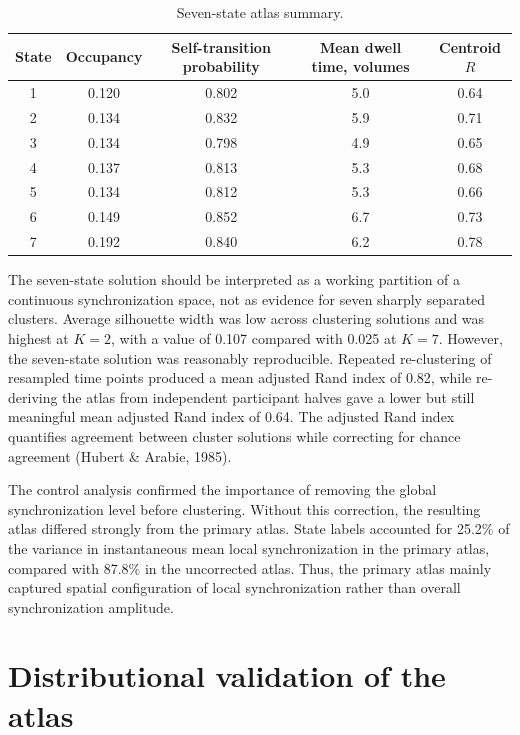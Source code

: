 \documentclass[12pt,a4paper]{report}
\newcommand{\compacttablestyle}{%
  \captionsetup{font=footnotesize,skip=2pt}%
  \small
  \setlength{\tabcolsep}{3pt}%
  \renewcommand{\arraystretch}{0.85}%
}
\begin{document}
\begin{table}[htbp]
\centering
\compacttablestyle
\caption{Seven-state atlas summary.}
\label{tab:seven_state_atlas_summary}
\begin{tabular}{@{}c c c c c@{}}
\toprule
\textbf{State} & \textbf{Occupancy} & \textbf{Self-transition probability} & \textbf{Mean dwell time, volumes} & \textbf{Centroid $R$} \\
\midrule
1 & 0.120 & 0.802 & 5.0 & 0.64 \\
2 & 0.134 & 0.832 & 5.9 & 0.71 \\
3 & 0.134 & 0.798 & 4.9 & 0.65 \\
4 & 0.137 & 0.813 & 5.3 & 0.68 \\
5 & 0.134 & 0.812 & 5.3 & 0.66 \\
6 & 0.149 & 0.852 & 6.7 & 0.73 \\
7 & 0.192 & 0.840 & 6.2 & 0.78 \\
\bottomrule
\end{tabular}
\end{table}

The seven-state solution should be interpreted as a working partition of a continuous synchronization space, not as evidence for seven sharply separated clusters. Average silhouette width was low across clustering solutions and was highest at $K=2$, with a value of 0.107 compared with 0.025 at $K=7$. However, the seven-state solution was reasonably reproducible. Repeated re-clustering of resampled time points produced a mean adjusted Rand index of 0.82, while re-deriving the atlas from independent participant halves gave a lower but still meaningful mean adjusted Rand index of 0.64. The adjusted Rand index quantifies agreement between cluster solutions while correcting for chance agreement (Hubert \& Arabie, 1985).

The control analysis confirmed the importance of removing the global synchronization level before clustering. Without this correction, the resulting atlas differed strongly from the primary atlas. State labels accounted for 25.2\% of the variance in instantaneous mean local synchronization in the primary atlas, compared with 87.8\% in the uncorrected atlas. Thus, the primary atlas mainly captured spatial configuration of local synchronization rather than overall synchronization amplitude.

\section{Distributional validation of the atlas}
\end{document}
